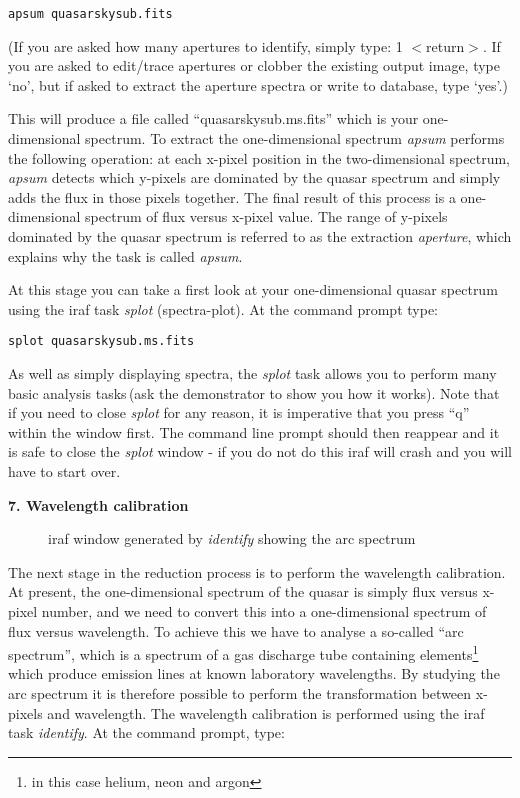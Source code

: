 {\tt apsum quasarskysub.fits}

(If you are asked how many apertures to identify, simply type: 1 $<$return$>$.  If you are asked to edit/trace apertures or clobber the existing output image, type `no', but if asked to extract the aperture spectra or write to database, type `yes'.)

This will produce a file called ``quasarskysub.ms.fits'' which is your one-dimensional spectrum. To extract the one-dimensional spectrum {\it apsum} performs the following operation: at each x-pixel position in the two-dimensional spectrum, {\it apsum} detects which y-pixels are dominated by the quasar spectrum and simply adds the flux in those pixels together. The final result of this process is a one-dimensional spectrum of flux versus x-pixel value. The range of y-pixels dominated by the quasar spectrum is referred to as the extraction {\it aperture}, which explains why the task is called {\it apsum}.

At this stage you can take a first look at your one-dimensional quasar spectrum using the {\sc iraf} task {\it splot} (spectra-plot). At the command prompt type:

{\tt splot quasarskysub.ms.fits}

As well as simply displaying spectra, the {\it splot} task allows you to perform many basic analysis tasks\,(ask the demonstrator to show you how it works). Note that if you need to close {\it splot} for any reason, it is imperative that you press ``q'' within the window first. The command line prompt should then reappear and it is safe to close the {\it splot} window - if you do not do this {\sc iraf} will crash and you will have to start over.

{\large {\bf 7. Wavelength calibration}}

\begin{figure}
\centerline{}
\caption{{\sc iraf} window generated by {\it identify} showing the
arc spectrum}
\end{figure}

The next stage in the reduction process is to perform the wavelength calibration. At present, the one-dimensional spectrum of the quasar is simply flux versus x-pixel number, and we need to convert this into a one-dimensional spectrum of flux versus wavelength. To achieve this we have to analyse a so-called ``arc spectrum'', which is a spectrum of a gas discharge tube containing elements\footnote{in this case helium, neon and argon} which produce emission lines at known laboratory wavelengths. By studying the arc spectrum it is therefore possible to perform the transformation between x-pixels and wavelength. The wavelength calibration is performed using the {\sc iraf} task {\it identify}. At the command prompt, type:

